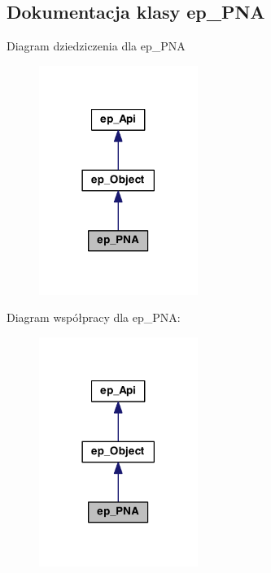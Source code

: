 \hypertarget{classep___p_n_a}{\subsection{Dokumentacja klasy ep\-\_\-\-P\-N\-A}
\label{classep___p_n_a}
}


Diagram dziedziczenia dla ep\-\_\-\-P\-N\-A\nopagebreak
\begin{figure}[H]
\begin{center}
\leavevmode
\includegraphics[width=146pt]{classep___p_n_a__inherit__graph}
\end{center}
\end{figure}


Diagram współpracy dla ep\-\_\-\-P\-N\-A\-:\nopagebreak
\begin{figure}[H]
\begin{center}
\leavevmode
\includegraphics[width=146pt]{classep___p_n_a__coll__graph}
\end{center}
\end{figure}
